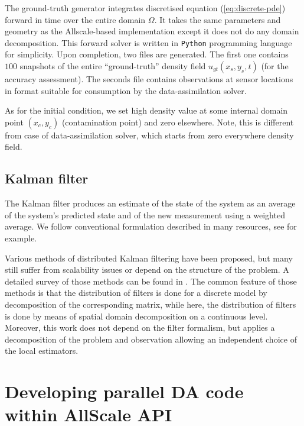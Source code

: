 \documentclass[acmsmall,review,anonymous]{acmart}\settopmatter{printfolios=true,printccs=false,printacmref=false}
\begin{document}
The ground-truth generator integrates discretised equation (\ref{eq:discrete-pde}) forward in time over the entire domain $\Omega$. It takes the same parameters and geometry as the Allscale-based implementation except it does not do any domain decomposition. This forward solver is written in \texttt{Python} programming language for simplicity. Upon completion, two files are generated. The first one contains $100$ snapshots of the entire ``ground-truth'' density field $u_{gt}(x_s,y_s,t)$ (for the accuracy assessment). The seconds file contains observations at sensor locations in format suitable for consumption by the data-assimilation solver. 

As for the initial condition, we set high density value at some internal domain point $(x_c,y_c)$ (contamination point) and zero elsewhere. Note, this is different from case of data-assimilation solver, which starts from zero everywhere density field.

\subsection{Kalman filter}

The Kalman filter produces an estimate of the state of the system as an average of the system's predicted state and of the new measurement using a weighted average. We follow conventional formulation described in many resources, see \cite{Welch06} for example.

Various methods of distributed Kalman filtering have been proposed, but many still suffer from scalability issues or depend on the structure of the problem. A detailed survey of those methods can be found in \citep{mahmoud2013distributed}. The common feature of those methods is that the distribution of filters is done for a discrete model by decomposition of the corresponding matrix, while here, the distribution of filters is done by means of spatial domain decomposition on
a continuous level. Moreover, this work does not depend on the filter formalism,
but applies a decomposition of the problem and observation allowing an independent choice of the local estimators.

\section{Developing parallel DA code within AllScale API}
\end{document}
